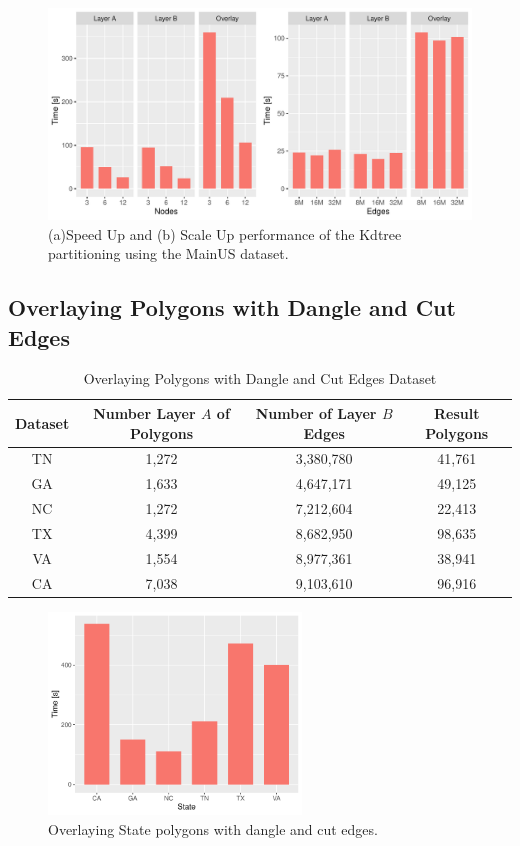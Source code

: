 \begin{figure}
    \centering
    \includegraphics[width=\textwidth]{chapterExtension/K_SS/K_SS}
    \caption{(a)Speed Up and (b) Scale Up performance of the Kdtree partitioning using the MainUS dataset.} \label{fig:k_scale_speed_us}
\end{figure}

\subsection{Overlaying Polygons with Dangle and Cut Edges}

\begin{table}
    \small
    \caption{Overlaying Polygons with Dangle and Cut Edges Dataset}
    \label{tab:dangles}
    \begin{tabular}{c c c c}
        \toprule
        Dataset & Number Layer $A$ of Polygons & Number of Layer $B$ Edges & Result Polygons \\
        \midrule
        TN & 1,272 & 3,380,780 & 41,761 \\
        GA & 1,633 & 4,647,171 & 49,125 \\
        NC & 1,272 & 7,212,604 & 22,413 \\
        TX & 4,399  & 8,682,950 & 98,635 \\
        VA & 1,554 & 8,977,361 & 38,941 \\
        CA & 7,038 & 9,103,610 & 96,916\\
        \bottomrule
    \end{tabular}
\end{table}

\begin{figure}
    \centering
    \includegraphics[width=0.6\textwidth]{chapterExtension/states.pdf}
    \caption{Overlaying State polygons with dangle and cut edges.}
    \label{fig:dangle}
\end{figure}

